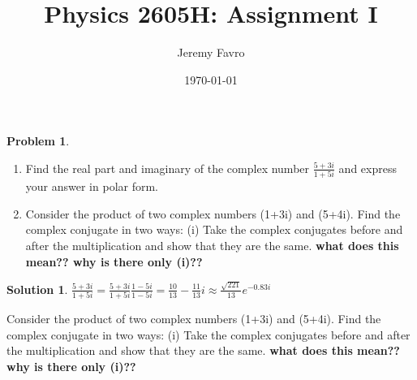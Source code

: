 \documentclass[10pt]{article}
\title{Physics 2605H: Assignment I}
\author{Jeremy Favro}
\date{\today}
\theoremstyle{definition}
\newtheorem{problem}{Problem}
\newtheorem{soln}{Solution}
\begin{document}
\maketitle

\begin{problem}~
\begin{enumerate}[label=(\alph*)]
  \item Find the real part and imaginary of the complex number $\frac{5+3i}{1+5i}$ and express your answer in polar form.
  \item Consider the product of two complex numbers (1+3i) and (5+4i). Find the complex conjugate in two ways:
        (i) Take the complex conjugates before and after the
        multiplication and show that they are the same. \textbf{what does this mean?? why is there only (i)??}
\end{enumerate}
\end{problem}
\begin{soln}
  \item $\frac{5+3i}{1+5i}=\frac{5+3i}{1+5i}\frac{1-5i}{1-5i}=\frac{10}{13}-\frac{11}{13}i\approx\frac{\sqrt{221}}{13}e^{-0.83i}$
  \item Consider the product of two complex numbers (1+3i) and (5+4i). Find the complex conjugate in two ways:
  (i) Take the complex conjugates before and after the
  multiplication and show that they are the same. \textbf{what does this mean?? why is there only (i)??}
\end{soln}
\end{document}
